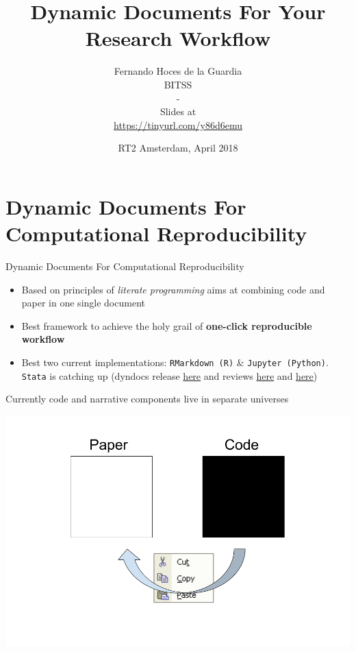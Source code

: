 \documentclass[ignorenonframetext,]{beamer}
\title{Dynamic Documents For Your Research Workflow}
\author{Fernando Hoces de la Guardia\\
BITSS\\
-\\
Slides at\\
\hspace*{0.333em}\url{https://tinyurl.com/y86d6emu}}
\date{RT2 Amsterdam, April 2018}
\providecommand{\tightlist}{%
  \setlength{\itemsep}{0pt}\setlength{\parskip}{0pt}}
\begin{document}
\frame{\titlepage}

\begin{frame}
\tableofcontents[hideallsubsections]
\end{frame}

\section{Dynamic Documents For Computational
Reproducibility}\label{dynamic-documents-for-computational-reproducibility}

\begin{frame}[fragile]{Dynamic Documents For Computational
Reproducibility}

\begin{itemize}
\tightlist
\item
  Based on principles of \emph{literate programming} aims at combining
  code and paper in one single document
\item
  Best framework to achieve the holy grail of \textbf{one-click
  reproducible workflow}
\item
  Best two current implementations: \texttt{RMarkdown\ (R)} \&
  \texttt{Jupyter\ (Python)}. \texttt{Stata} is catching up (dyndocs
  release \href{https://www.stata.com/new-in-stata/markdown/}{here} and
  reviews
  \href{http://data.princeton.edu/stata/markdown/markstat.htm}{here} and
  \href{https://www.bitss.org/2017/09/05/review-of-statas-dyndoc/}{here})
\end{itemize}

\end{frame}

\begin{frame}{Currently code and narrative components live in separate
universes}

\includegraphics{../Images/Two universes.png}

\end{frame}
\end{document}
